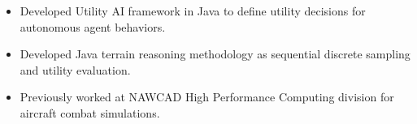 \begin{itemize}
    \item Developed Utility AI framework in Java to define utility decisions for autonomous agent behaviors.
    \item Developed Java terrain reasoning methodology as sequential discrete sampling and utility evaluation.
    \item Previously worked at NAWCAD High Performance Computing division for aircraft combat simulations.

\end{itemize}
